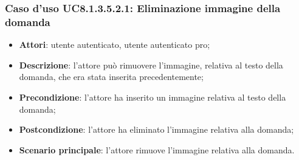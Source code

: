\subsubsection{Caso d'uso UC8.1.3.5.2.1: Eliminazione immagine della domanda}
\begin{itemize}
	\item\textbf{Attori}: utente autenticato, utente autenticato pro;
	\item\textbf{Descrizione}: l'attore può rimuovere l'immagine, relativa al testo della domanda, che era stata inserita precedentemente;
	\item\textbf{Precondizione}: l'attore ha inserito un immagine relativa al testo della domanda;
	\item \textbf{Postcondizione}: l'attore ha eliminato l'immagine relativa alla domanda;
	\item\textbf{Scenario principale}: l'attore rimuove l'immagine relativa alla domanda. 
\end{itemize}

